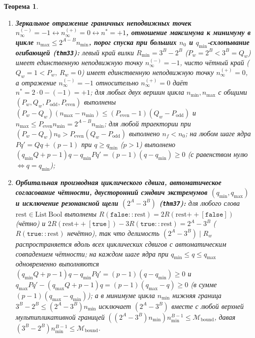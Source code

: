 \documentclass[11pt,a4paper]{article}
\newtheorem{theorem}{Теорема}[section]
\theoremstyle{definition}
\theoremstyle{remark}
\begin{document}
\begin{theorem}
\begin{enumerate}[label=\textbf{(\roman*)},leftmargin=*,noitemsep]
\item \textbf{Зеркальное отражение граничных неподвижных точек $n_\infty^{(-)}=-1 \leftrightarrow n_\infty^{(+)}=0 \leftrightarrow n^*=+1$, отношение максимума к минимуму в цикле $n_{\max} \le 2^{A-B}n_{\min}$, порог спуска при больших $n_0$ и $q_{\min}$-схлопывание огибающей (\texttt{thm33}):}
  левый край вилки $R_{\min}=3^B-2^B$ ($P_w=2^B < 3^B=Q_w$) имеет единственную неподвижную точку $n_\infty^{(-)}=-1$, чисто чётный край ($Q_w=1 < P_w,\ R_w=0$) имеет единственную неподвижную точку $n_\infty^{(+)}=0$, а отражение $n_\infty^{(-)}=-1$ относительно $n_\infty^{(+)}=0$ даёт $n^* = 2\cdot 0 - (-1) = +1$; для любых двух вершин цикла $n_{\min},n_{\max}$ с общими $(P_w,Q_w,P_{\mathrm{odd}},P_{\mathrm{even}})$ выполнены $(P_w-Q_w)(n_{\max}-n_{\min}) \le (P_{\mathrm{even}}-1)(Q_w-P_{\mathrm{odd}})$ и $n_{\max} \le P_{\mathrm{even}} n_{\min} = 2^{A-B}n_{\min}$; для любой траектории при $(P_w-Q_w)n_0 > P_{\mathrm{even}}(Q_w-P_{\mathrm{odd}})$ выполнено $n_f < n_0$; на любом шаге ядра $P q' = Q q + (p-1)$ при $q \ge q_{\min}$ ($p > 1$) выполнено $(q_{\min}Q+p-1)q - q_{\min}P q' = (p-1)(q-q_{\min}) \ge 0$ (с равенством нулю $\iff q = q_{\min}$);
\item \textbf{Орбитальная производная циклического сдвига, автоматическое согласование чётности, двусторонний сэндвич экстремумов $(q_{\min},q_{\max})$ и исключение резонансной щели $(2^A-3^B)$ (\texttt{thm37}):}
  для любого слова $\mathrm{rest}\in\mathrm{List}\ \mathrm{Bool}$ выполнены $R(\texttt{false}::\mathrm{rest}) = 2 R(\mathrm{rest}\mathbin{++}[\texttt{false}])$ (чётно) и $2 R(\mathrm{rest}\mathbin{++}[\texttt{true}]) - 3 R(\texttt{true}::\mathrm{rest}) = 2^A - 3^B$ ($R(\texttt{true}::\mathrm{rest})$ нечётно), так что делимость $(2^A-3^B)\mid R_w$ распространяется вдоль всех циклических сдвигов с автоматическим совпадением чётности; на каждом шаге ядра при $q_{\min}\le q\le q_{\max}$ одновременно выполняются $(q_{\min}Q+p-1)q - q_{\min}P q' = (p-1)(q-q_{\min}) \ge 0$ и $q_{\max}P q' - (q_{\max}Q+p-1)q = (p-1)(q_{\max}-q) \ge 0$ (в сумме $(p-1)(q_{\max}-q_{\min})$); а в минимуме цикла $n_{\min}$ нижняя граница $3^B-2^B \le (2^A-3^B)n_{\min}$ исключает $(2^A-3^B)$ вместе с любой верхней мультипликативной границей $((2^A-3^B)n_{\min})n_{\min}^{B-1} \le \mathcal{M}_{\mathrm{bound}}$, давая $(3^B-2^B)n_{\min}^{B-1} \le \mathcal{M}_{\mathrm{bound}}$.
\end{enumerate}
\end{theorem}
\end{document}
